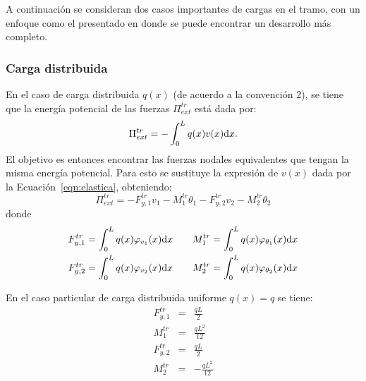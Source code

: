 A continuación se consideran dos casos importantes de cargas en el tramo, con un enfoque como el presentado en \citep{Onate2013} donde se puede encontrar un desarrollo más completo. %

\subsubsection{Carga distribuida}

En el caso de carga distribuida $q(x)$ (de acuerdo a la convención 2), se tiene que la energía potencial de las fuerzas $\Pi^{tr}_{ext}$ está dada por:
%
\begin{equation}
\Pi_{ext}^{tr} =
- \int_0^L q(x) v(x) {\text{d}} x.
\end{equation}
%
El objetivo es entonces encontrar las fuerzas nodales equivalentes que tengan la misma energía potencial. Para esto se sustituye la expresión de $v(x)$ dada por la Ecuación~\eqref{eqn:elastica}, obteniendo:
%
\begin{equation}
\Pi_{ext}^{tr} =
-F_{y,1}^{tr} v_1 - M_1^{tr} \theta_1 -F_{y,2}^{tr} v_2 -  M_2^{tr} \theta_2
\end{equation}
donde
\begin{eqnarray}
F_{y,1}^{tr} = \int_{0}^{L} q(x) \varphi_{v_1}(x) {\text{d}} x \qquad & \displaystyle M_1^{tr} = \int_{0}^{L}q(x) \varphi_{\theta_1}(x)  {\text{d}} x  \nonumber\\
F_{y,2}^{tr} = \int_{0}^{L}q(x) \varphi_{v_2}(x)  {\text{d}} x \qquad & \displaystyle M_2^{tr} = \int_{0}^{L} q(x)\varphi_{\theta_2}(x)  {\text{d}} x  \nonumber
\end{eqnarray}

En el caso particular de carga distribuida uniforme $q(x) = q$ se tiene:
%
\begin{eqnarray}
F_{y,1}^{tr} &=& \frac{q L}{2} \\
M_1^{tr} &=& \frac{q L^{2}}{12} \\
F_{y,2}^{tr} &=& \frac{q L}{2} \\
M_2^{tr} &=& - \frac{q L^{2}}{12}
\end{eqnarray}


